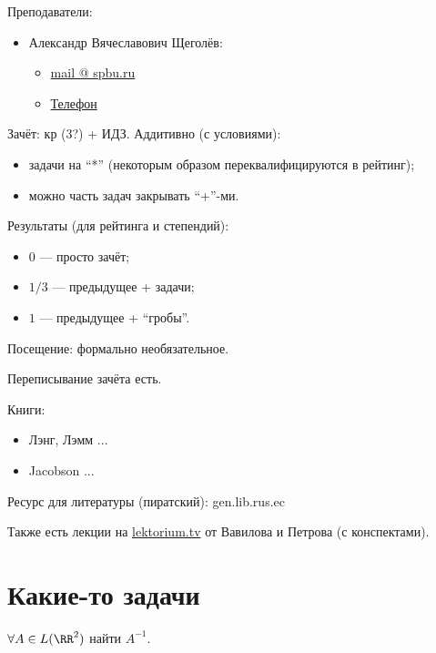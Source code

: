 \documentclass[12pt,a4paper]{article}
\begin{document}
    Преподаватели:
    \begin{itemize}
        \item Александр Вячеславович Щеголёв:
            \begin{itemize}
                \item \href{mailto:a.shchegolev@spbu.ru}{mail @ spbu.ru}
                \item \href{tel:+7-950-014-32-27}{Телефон}
            \end{itemize}
    \end{itemize}

    Зачёт: кр (3?) + ИДЗ. Аддитивно (с условиями):
    \begin{itemize}
        \item задачи на ``*'' (некоторым образом переквалифицируются в рейтинг);
        \item можно часть задач закрывать ``+''-ми.
    \end{itemize}

    Результаты (для рейтинга и степендий):
    \begin{itemize}
        \item $0$ --- просто зачёт;
        \item $1/3$ --- предыдущее + задачи;
        \item $1$ --- предыдущее + ``гробы''.
    \end{itemize}

    Посещение: формально необязательное.

    Переписывание зачёта есть.

    Книги:
    \begin{itemize}
        \item Лэнг, Лэмм ...
        \item Jacobson ...
    \end{itemize}

    Ресурс для литературы (пиратский): gen.lib.rus.ec

    Также есть лекции на \href{https://www.lektorium.tv/}{lektorium.tv} от Вавилова и Петрова (с конспектами).

    \section{Какие-то задачи}

    \begin{problem}
        $\forall A \in L(\RR^2)$ найти $A^{-1}$.
    \end{problem}
\end{document}

